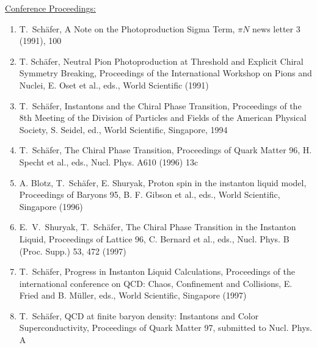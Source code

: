 \underline{Conference Proceedings:}
\begin{enumerate}
\setcounter{enumi}{\value{myitem}}

\item{T.~Sch\"afer, A Note on the Photoproduction Sigma Term, $\pi N$
news letter 3 (1991), 100}

\item{ T. Sch\"afer, Neutral Pion Photoproduction at Threshold and
Explicit Chiral Symmetry Breaking, Proceedings of the International
Workshop on Pions and Nuclei, E. Oset et al., eds., World Scientific 
(1991) }

\item{T.~Sch\"afer, Instantons and the Chiral Phase Transition, Proceedings 
of the 8th Meeting of the Division of Particles and Fields of the 
American Physical Society, S. Seidel, ed., World Scientific, Singapore,
1994}

\item{T.~Sch\"afer, The Chiral Phase Transition, Proceedings of 
Quark Matter 96, H. Specht et al., eds., Nucl. Phys. A610 (1996) 13c}

\item{A. Blotz, T.~Sch\"afer, E. Shuryak, Proton spin in the 
instanton liquid model, Proceedings of Baryons 95, B. F. Gibson
et al., eds., World Scientific, Singapore (1996)}

\item{E.~V.~Shuryak, T.~Sch\"afer, The Chiral Phase Transition in
the Instanton Liquid, Proceedings of Lattice 96, C. Bernard et al.,
eds., Nucl. Phys. B (Proc. Supp.) 53, 472 (1997) }

\item{T.~Sch\"afer, Progress in Instanton Liquid Calculations, Proceedings 
of the international conference on QCD: Chaos, Confinement and Collisions,
E. Fried and B. M\"uller, eds., World Scientific, Singapore (1997)}

\item{T.~Sch\"afer, QCD at finite baryon density: Instantons and Color
Superconductivity, Proceedings of Quark Matter 97, submitted to 
Nucl. Phys. A}

\end{enumerate}

